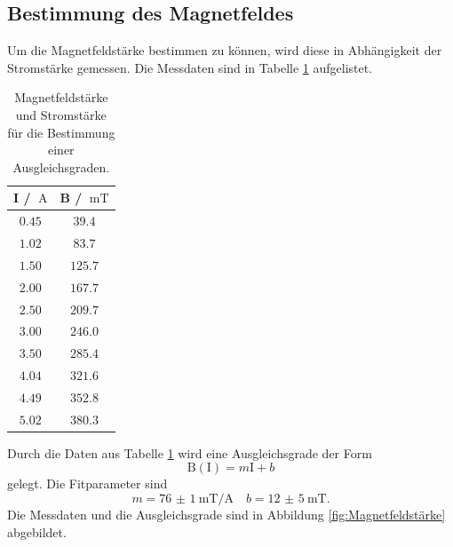 \subsection{Bestimmung des Magnetfeldes}
Um die Magnetfeldstärke bestimmen zu können, wird diese in Abhängigkeit der Stromstärke gemessen. Die Messdaten
sind in Tabelle \ref{tab:Magnetfeldstärke} aufgelistet.
\FloatBarrier
\begin{table}
    \centering
    \caption{Magnetfeldstärke und Stromstärke für die Bestimmung einer Ausgleichsgraden.}
    \label{tab:Magnetfeldstärke}
    \begin{tabular}{c c}
        \toprule
        I / $\SI{}{\ampere}$&B / $\SI{}{\milli\tesla}$\\
        \midrule
        $\num{0.45}$&$\num{39.4}$\\
        $\num{1.02}$&$\num{83.7}$\\
        $\num{1.50}$&$\num{125.7}$\\
        $\num{2.00}$&$\num{167.7}$\\
        $\num{2.50}$&$\num{209.7}$\\
        $\num{3.00}$&$\num{246.0}$\\
        $\num{3.50}$&$\num{285.4}$\\
        $\num{4.04}$&$\num{321.6}$\\
        $\num{4.49}$&$\num{352.8}$\\
        $\num{5.02}$&$\num{380.3}$\\
        \bottomrule
    \end{tabular}
\end{table}
\FloatBarrier
Durch die Daten aus Tabelle \ref{tab:Magnetfeldstärke} wird eine Ausgleichsgrade der Form
\begin{equation*}
    \text{B}(\text{I}) = m\text{I} +b
\end{equation*}
gelegt.
Die Fitparameter sind 
\begin{equation*}
    m = \SI{76(1)}{\milli\tesla\per\ampere} \quad b = \SI{12(5)}{\milli\tesla}.
\end{equation*}
Die Messdaten und die Ausgleichsgrade sind in Abbildung \ref{fig:Magnetfeldstärke} abgebildet.
\FloatBarrier

